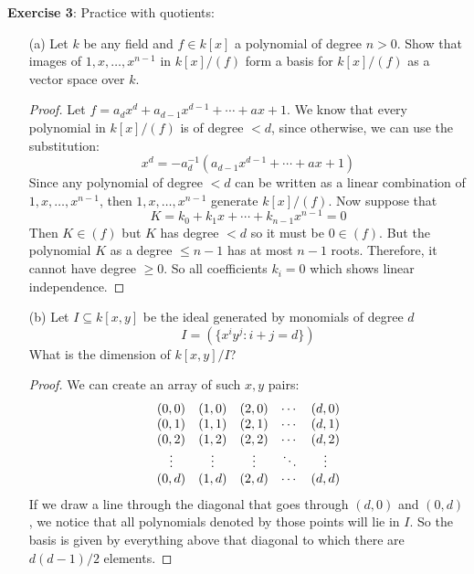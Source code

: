\documentclass{article}
\begin{document}
\textbf{Exercise 3}: Practice with quotients:
    \begin{itemize}
        \item [(a)] Let $k$ be any field and $f \in k[x]$ a polynomial of degree $n> 0$. Show that images of $1, x, \ldots , x^{n - 1}$ in $k[x]/(f)$ form a basis for $k[x]/(f)$ as a vector space over $k$. 
            \begin{proof}
                Let $f = a_{d}x^{d} + a_{d - 1}x^{d - 1} + \cdots  + ax + 1$. We know that every polynomial in $k[x]/(f)$ is of degree $< d$, since otherwise, we can use the substitution:
                    \begin{equation*}
                        x^{d} = -a_{d}^{-1}(a_{d - 1}x^{d - 1} + \cdots +ax + 1)
                    \end{equation*}
                Since any polynomial of degree $< d$ can be written as a linear combination of $1, x, \ldots , x^{n - 1}$, then $1, x, \ldots , x^{n - 1}$ generate $k[x]/(f)$. Now suppose that 
                    \begin{equation*}
                        K = k_{0} + k_{1}x + \cdots + k_{n - 1}x^{n - 1} = 0
                    \end{equation*}
                Then $K \in (f)$ but $K$ has degree $<  d$ so it must be $0 \in (f)$. But the polynomial $K$ as a degree $\leq n - 1$ has at most $n - 1$ roots. Therefore, it cannot have degree $\geq 0$. So all coefficients $k_{i} = 0$ which shows linear independence.
            \end{proof}

        \item [(b)] Let $I \subseteq k[x, y]$ be the ideal generated by monomials of degree $d$
            \begin{equation*}
                I = (\{x^{i}y^{j} : i + j = d\})
            \end{equation*}
        What is the dimension of $k[x, y]/I$?
            \begin{proof}
                We can create an array of such $x, y$ pairs:
                    \begin{align*}
                        \begin{array}{ c c c c c }
                            (0, 0)  & (1, 0)  & (2, 0)  & \cdots  & (d, 0)  \\
                            (0, 1)  & (1, 1)  & (2, 1)  & \cdots  & (d, 1)  \\
                            (0, 2)  & (1, 2)  & (2, 2)  & \cdots  & (d, 2)  \\
                            \vdots  & \vdots  & \vdots  & \ddots  & \vdots  \\
                            (0, d)  & (1, d)  & (2, d)  & \cdots  & (d, d)    
                        \end{array}
                    \end{align*}
                If we draw a line through the diagonal that goes through $(d, 0)$ and $(0, d)$, we notice that all polynomials denoted by those points will lie in $I$. So the basis is given by everything above that diagonal to which there are $d(d - 1)/2$ elements.
            \end{proof}


\end{itemize}
\end{document}
